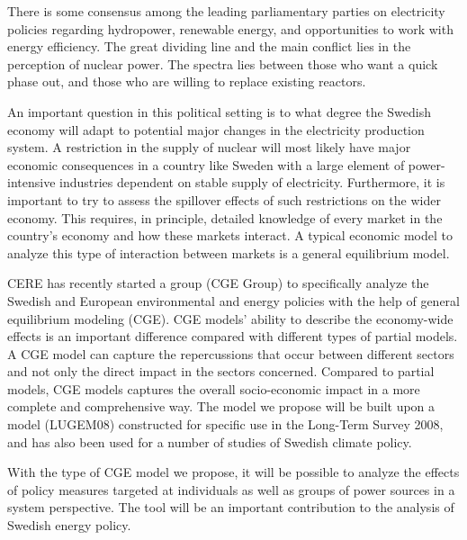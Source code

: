 There is some consensus among the leading parliamentary parties on electricity policies regarding hydropower, renewable energy, and opportunities to work with energy efficiency. The great dividing line and the main conflict lies in the perception of nuclear power. The spectra lies between those who want a quick phase out, and those who are willing to replace existing reactors.

An important question in this political setting is to what degree the Swedish economy will adapt to potential major changes in the electricity production system. A restriction in the supply of nuclear will most likely have major economic consequences in a country like Sweden with a large element of power-intensive industries dependent on stable supply of electricity. Furthermore, it is important to try to assess the spillover effects of such restrictions on the wider economy. This requires, in principle, detailed knowledge of every market in the country's economy and how these markets interact. A typical economic model to analyze this type of interaction between markets is a general equilibrium model.

CERE has recently started a group (CGE Group) to specifically analyze the Swedish and European environmental and energy policies with the help of general equilibrium modeling (CGE). CGE models' ability to describe the economy-wide effects is an important difference compared with different types of partial models. A CGE model can capture the repercussions that occur between different sectors and not only the direct impact in the sectors concerned. Compared to partial models, CGE models captures the overall socio-economic impact in a more complete and comprehensive way. The model we propose will be built upon a model (LUGEM08) constructed for specific use in the Long-Term Survey 2008, and has also been used for a number of studies of Swedish climate policy.

With the type of CGE model we propose, it will be possible to analyze the effects of policy measures targeted at individuals as well as groups of power sources in a system perspective. The tool will be an important contribution to the analysis of Swedish energy policy.

